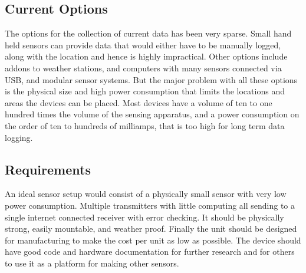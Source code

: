 \documentclass[10pt]{article}
\begin{document}
\subsection{Current Options}
The options for the collection of current data has been very sparse. Small hand held sensors can
provide data that would either have to be manually logged, along with the location and hence is 
highly impractical. Other options include addons to weather stations, and computers with many 
sensors connected via USB, and modular sensor systems. But the major problem with 
all these options is the physical size and high power consumption that limits the locations and 
areas the devices can be placed. Most devices have a volume of ten to one hundred times the 
volume of the sensing apparatus, and a power consumption on the order of ten to hundreds of 
milliamps, that is too high for long term data logging.

\subsection{Requirements}
An ideal sensor setup would consist of a physically small sensor with very low power consumption. 
Multiple transmitters with little computing all sending to a single internet connected receiver 
with error checking. It should be physically strong, easily mountable, and weather proof. Finally
the unit should be designed for manufacturing to make the cost per unit as low as possible. The 
device should have good code and hardware documentation for further research and for others to use 
it as a platform for making other sensors.

\pagebreak


\end{document}
